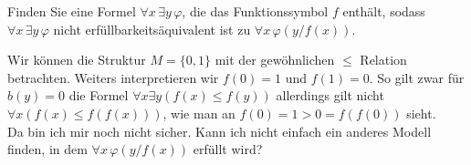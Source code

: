 
\begin{exercise}[176]
Finden Sie eine Formel $\forall x\, \exists y\, \varphi$, die das Funktionssymbol $f$
enthält, sodass $\forall x\, \exists y\, \varphi$ nicht erfüllbarkeitsäquivalent ist zu
$\forall x\, \varphi(y/f(x))$.
\end{exercise}


\begin{solution}
	Wir können die Struktur $M = \{0, 1\}$ mit der gewöhnlichen $\leq$ Relation betrachten.
  Weiters interpretieren wir $f(0) = 1$ und $f(1) = 0$.
  So gilt zwar für $b(y) = 0$ die Formel $\forall x \exists y (f(x) \leq f(y))$
  allerdings gilt nicht $\forall x (f(x) \leq f(f(x)))$,
  wie man an $f(0) = 1 > 0 = f(f(0))$ sieht. \\


  Da bin ich mir noch nicht sicher. Kann ich nicht einfach ein anderes Modell
  finden, in dem $\forall x\, \varphi(y/f(x))$ erfüllt wird?
\end{solution}

